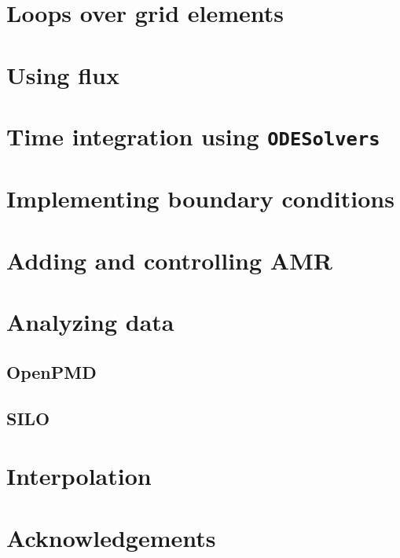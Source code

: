 \section{Loops over grid elements}
\label{sec:loops}


\section{Using flux}
\label{sec:flux}

\section{Time integration using \texttt{ODESolvers}}
\label{sec:odesolvers}


\section{Implementing boundary conditions}
\label{sec:bcs}

\section{Adding and controlling AMR}
\label{sec:amr}


\section{Analyzing data}
\label{sec:data}

\subsection{OpenPMD}
\label{sec:openpmd}

\subsection{SILO}
\label{sec:silo}

\section{Interpolation}
\label{sec:interpolation}

\section{Acknowledgements}

\begin{thebibliography}{9}
\end{thebibliography}



